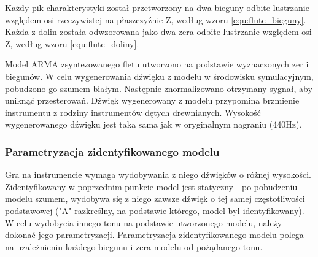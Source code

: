 Każdy pik charakterystyki został przetworzony na dwa bieguny odbite lustrzanie względem osi rzeczywistej na płaszczyźnie Z, według wzoru \ref{equ:flute_bieguny}. Każda z dolin została odwzorowana jako dwa zera odbite lustrzanie względem osi Z, według wzoru \ref{equ:flute_doliny}.

Model ARMA zsyntezowanego fletu utworzono na podstawie wyznaczonych zer i biegunów. W celu wygenerowania dźwięku z modelu w środowisku symulacyjnym, pobudzono go szumem białym. Następnie znormalizowano otrzymany sygnał, aby uniknąć przesterowań. Dźwięk wygenerowany z modelu przypomina brzmienie instrumentu z rodziny instrumentów dętych drewnianych. Wysokość wygenerowanego dźwięku jest taka sama jak w oryginalnym nagraniu (440Hz).

\subsubsection{Parametryzacja zidentyfikowanego modelu}
Gra na instrumencie wymaga wydobywania z niego dźwięków o różnej wysokości. Zidentyfikowany w poprzednim punkcie model jest statyczny - po pobudzeniu modelu szumem, wydobywa się z niego zawsze dźwięk o tej samej częstotliwości podstawowej ("A" razkreślny, na podstawie którego, model był identyfikowany). W celu wydobycia innego tonu na podstawie utworzonego modelu, należy dokonać jego parametryzacji. Parametryzacja zidentyfikowanego modelu polega na uzależnieniu każdego biegunu i zera modelu od pożądanego tonu.

